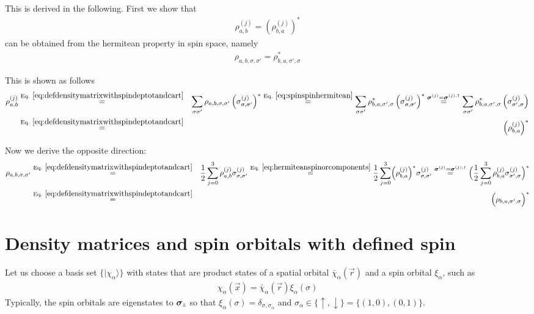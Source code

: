 \documentclass[11pt,a4paper]{report}
\begin{document}
This is derived in the following. First we show that 
\begin{eqnarray}
\rho^{(j)}_{a,b}=\left(\rho^{(j)}_{b,a}\right)^*
\label{eq:hermiteanspinorcomponents}
\end{eqnarray}
can be obtained from the hermitean property in spin space, namely
\begin{eqnarray}
\rho_{a,b,\sigma,\sigma'}=\rho^*_{b,a,\sigma',\sigma}
\label{eq:spinspinhermitean}
\end{eqnarray}

This is shown as follows
\begin{eqnarray}
\rho^{(j)}_{a,b}
&\eqrel{eq:defdensitymatrixwithspindeptotandcart}{=}&
\sum_{\sigma\sigma'}\rho_{a,b,\sigma,\sigma'}
\left(\sigma^{(j)}_{\sigma,\sigma'}\right)^*
\eqrel{eq:spinspinhermitean}{=}
\sum_{\sigma\sigma'}\rho^*_{b,a,\sigma',\sigma}
\left(\sigma^{(j)}_{\sigma,\sigma'}\right)^*
\stackrel{\mat{\sigma}^{(j)}=\mat{\sigma}^{(j),\dagger}}{=}
\sum_{\sigma\sigma'}\rho^*_{b,a,\sigma',\sigma}
\left(\sigma^{(j)}_{\sigma',\sigma}\right)
\nonumber\\
&\eqrel{eq:defdensitymatrixwithspindeptotandcart}{=}&
\left(\rho^{(j)}_{b,a}\right)^*
\end{eqnarray}

Now we derive the opposite direction:
\begin{eqnarray}
\rho_{a,b,\sigma,\sigma'}
&\eqrel{eq:defdensitymatrixwithspindeptotandcart}{=}&
\frac{1}{2}\sum_{j=0}^3\rho^{(j)}_{a,b}\sigma^{(j)}_{\sigma,\sigma'}
\eqrel{eq:hermiteanspinorcomponents}{=}
\frac{1}{2}\sum_{j=0}^3\Bigl(\rho^{(j)}_{b,a}\Bigr)^*\sigma^{(j)}_{\sigma,\sigma'}
\stackrel{\mat{\sigma}^{(j)}=\mat{\sigma}^{(j),\dagger}}{=}
\Bigl(\frac{1}{2}\sum_{j=0}^3\rho^{(j)}_{b,a}\sigma^{(j)}_{\sigma',\sigma}\Bigr)^*
\nonumber\\
&\eqrel{eq:defdensitymatrixwithspindeptotandcart}{=}&
\Bigl(\rho_{b,a,\sigma',\sigma}\Bigr)^*
\end{eqnarray}


\section{Density matrices and spin orbitals with defined spin}
Let us choose a basis set $\{|\chi_\alpha\rangle\}$ with states that
are product states of a spatial orbital $\bar{\chi}_\alpha(\vec{r})$
and a spin orbital $\xi_\alpha$, such as
\begin{eqnarray}
\chi_\alpha(\vec{x})=\bar{\chi}_\alpha(\vec{r})\xi_\alpha(\sigma)
\label{eq:chiasproductofspaceandspin}
\end{eqnarray}
Typically, the spin orbitals are eigenstates to $\bm{\sigma}_z$ so
that $\xi_\alpha(\sigma)=\delta_{\sigma,\sigma_\alpha}$ and
$\sigma_\alpha\in\{\uparrow,\downarrow\}=\{(1,0),(0,1)\}$.
\end{document}

